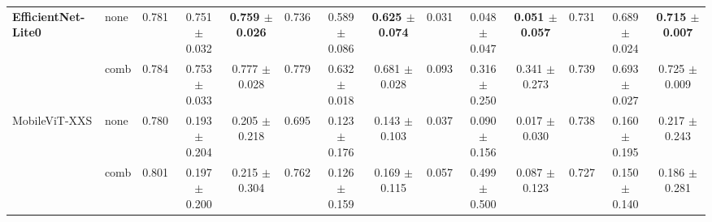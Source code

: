 \begin{table}[ht]
\begin{adjustbox}{max width=\textwidth}
\begin{tabular}{llccc@{\hskip 6pt}ccc@{\hskip 6pt}ccc@{\hskip 6pt}ccc}
\textbf{EfficientNet-Lite0} & none & 0.781 & 0.751 $\pm$ 0.032 & \textbf{0.759 $\pm$ 0.026} & 0.736 & 0.589 $\pm$ 0.086 & \textbf{0.625 $\pm$ 0.074} & 0.031 & 0.048 $\pm$ 0.047 & \textbf{0.051 $\pm$ 0.057} & 0.731 & 0.689 $\pm$ 0.024 & \textbf{0.715 $\pm$ 0.007} \\
                   & comb & 0.784 & 0.753 $\pm$ 0.033 & 0.777 $\pm$ 0.028 & 0.779 & 0.632 $\pm$ 0.018 & 0.681 $\pm$ 0.028 & 0.093 & 0.316 $\pm$ 0.250 & 0.341 $\pm$ 0.273 & 0.739 & 0.693 $\pm$ 0.027 & 0.725 $\pm$ 0.009 \\
MobileViT-XXS      & none & 0.780 & 0.193 $\pm$ 0.204 & 0.205 $\pm$ 0.218 & 0.695 & 0.123 $\pm$ 0.176 & 0.143 $\pm$ 0.103 & 0.037 & 0.090 $\pm$ 0.156 & 0.017 $\pm$ 0.030 & 0.738 & 0.160 $\pm$ 0.195 & 0.217 $\pm$ 0.243 \\
                   & comb & 0.801 & 0.197 $\pm$ 0.200 & 0.215 $\pm$ 0.304 & 0.762 & 0.126 $\pm$ 0.159 & 0.169 $\pm$ 0.115 & 0.057 & 0.499 $\pm$ 0.500 & 0.087 $\pm$ 0.123 & 0.727 & 0.150 $\pm$ 0.140 & 0.186 $\pm$ 0.281 \\
\bottomrule
\end{tabular}
\end{adjustbox}
\end{table}
